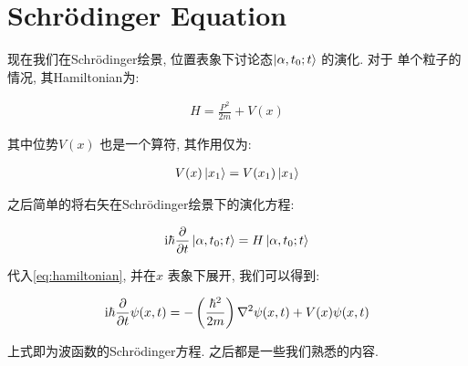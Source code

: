 \section{Schr\"odinger Equation}

现在我们在Schr\"odinger绘景, 位置表象下讨论态$\ket{\alpha, t_0; t}$ 的演化. 对于
单个粒子的情况, 其Hamiltonian为:

\begin{equation}\label{eq:hamiltonian}
  \begin{aligned}
    H = \frac{P^{2}}{2m} + V(x)
  \end{aligned}
\end{equation}

其中位势$V(x)$ 也是一个算符, 其作用仅为:

\begin{equation}
  \begin{aligned}
    V(x)\ket{x_1} = V(x_1) \ket{x_1}
  \end{aligned}
\end{equation}

之后简单的将右矢在Schr\"odinger绘景下的演化方程:

\begin{equation}
  \begin{aligned}
    {\rm i} \hbar \pdv{}{t} \ket{\alpha, t_0; t} = H \ket{\alpha, t_0; t}
  \end{aligned}
\end{equation} 

代入\ref{eq:hamiltonian}, 并在$x$ 表象下展开, 我们可以得到:

\begin{equation}
  \begin{aligned}
    {\rm i}\hbar \pdv{}{t} \psi(x, t) = - \left(\frac{\hbar^{2}}{2m}\right) \nabla^{2} \psi(x, t) + V(x) \psi(x,t)
  \end{aligned}
\end{equation}

上式即为波函数的Schr\"odinger方程. 之后都是一些我们熟悉的内容.
